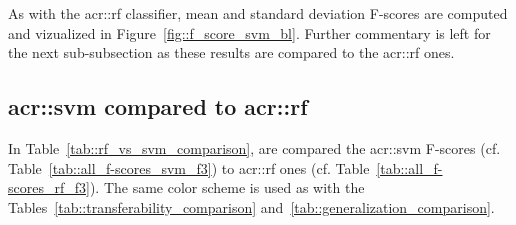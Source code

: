         As with the \gls{acr::rf} classifier, mean and standard deviation F-scores are computed and vizualized in Figure~\ref{fig::f_score_svm_bl}.
        Further commentary is left for the next sub-subsection as these results are compared to the \gls{acr::rf} ones.

        \begin{figure}[htpb]
            \centering
        \end{figure}

    \subsection{\texorpdfstring{\acrshort*{acr::svm}}{SVM} compared to \texorpdfstring{\acrshort*{acr::rf}}{RF}}
        \label{subsec::more_experiments::classifier::svm_rf}
        In Table~\ref{tab::rf_vs_svm_comparison}, are compared the \gls{acr::svm} F-scores (cf. Table~\ref{tab::all_f-scores_svm_f3}) to \gls{acr::rf} ones (cf. Table~\ref{tab::all_f-scores_rf_f3}).
        The same color scheme is used as with the Tables~\ref{tab::transferability_comparison} and~\ref{tab::generalization_comparison}.\\

